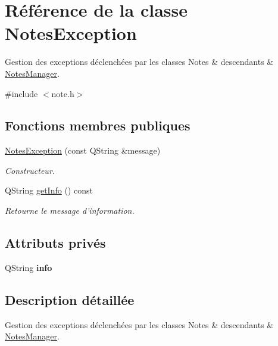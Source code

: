 \hypertarget{class_notes_exception}{\section{Référence de la classe Notes\-Exception}
\label{class_notes_exception}
}


Gestion des exceptions déclenchées par les classes Notes \& descendants \& \hyperlink{class_notes_manager}{Notes\-Manager}.  




{\ttfamily \#include $<$note.\-h$>$}

\subsection*{Fonctions membres publiques}
\begin{DoxyCompactItemize}
\item 
\hyperlink{class_notes_exception_af10aca61d1cb993b62e868f0fe9bf144}{Notes\-Exception} (const Q\-String \&message)
\begin{DoxyCompactList}\small\item\em Constructeur. \end{DoxyCompactList}\item 
\hypertarget{class_notes_exception_abe69dc0035ff93205ec8aeb1770ab8c5}{Q\-String \hyperlink{class_notes_exception_abe69dc0035ff93205ec8aeb1770ab8c5}{get\-Info} () const }\label{class_notes_exception_abe69dc0035ff93205ec8aeb1770ab8c5}

\begin{DoxyCompactList}\small\item\em Retourne le message d'information. \end{DoxyCompactList}\end{DoxyCompactItemize}
\subsection*{Attributs privés}
\begin{DoxyCompactItemize}
\item 
\hypertarget{class_notes_exception_aecb11237ade9530825d317daed9d7aa7}{Q\-String {\bfseries info}}\label{class_notes_exception_aecb11237ade9530825d317daed9d7aa7}

\end{DoxyCompactItemize}


\subsection{Description détaillée}
Gestion des exceptions déclenchées par les classes Notes \& descendants \& \hyperlink{class_notes_manager}{Notes\-Manager}. 

